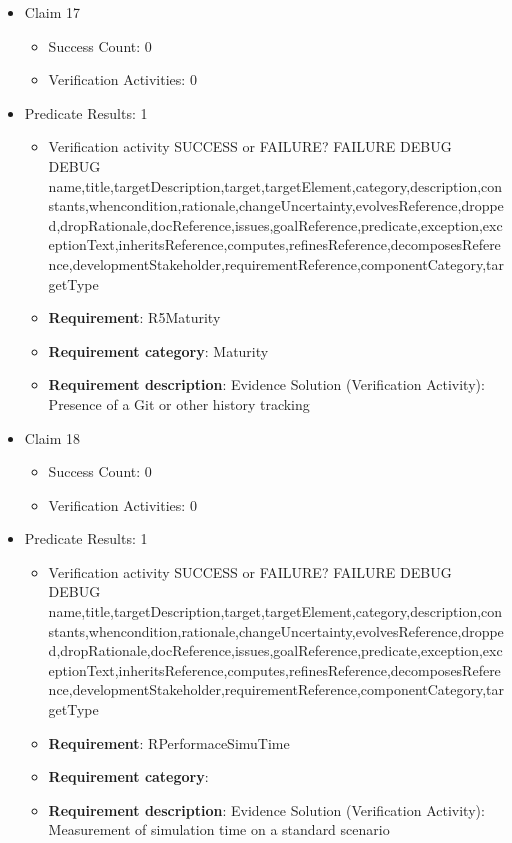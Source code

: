 \documentclass{article}
\begin{document}
\begin{itemize}
  				  \item Claim 17
				\begin{itemize}
			    	\item Success Count: 0 
			    	\item Verification Activities: 0
				\end{itemize}
				
									    
				\item Predicate Results: 1
					\begin{itemize}				
					\item Verification activity SUCCESS or FAILURE? FAILURE
					DEBUG DEBUG name,title,targetDescription,target,targetElement,category,description,constants,whencondition,rationale,changeUncertainty,evolvesReference,dropped,dropRationale,docReference,issues,goalReference,predicate,exception,exceptionText,inheritsReference,computes,refinesReference,decomposesReference,developmentStakeholder,requirementReference,componentCategory,targetType
					\item \textbf{Requirement}: R5Maturity 
					\item \textbf{Requirement category}: Maturity
					\item \textbf{Requirement description}: Evidence Solution (Verification Activity): Presence of a Git or other history tracking
					\end{itemize}

  				  \item Claim 18
				\begin{itemize}
			    	\item Success Count: 0 
			    	\item Verification Activities: 0
				\end{itemize}
				
									    
				\item Predicate Results: 1
					\begin{itemize}				
					\item Verification activity SUCCESS or FAILURE? FAILURE
					DEBUG DEBUG name,title,targetDescription,target,targetElement,category,description,constants,whencondition,rationale,changeUncertainty,evolvesReference,dropped,dropRationale,docReference,issues,goalReference,predicate,exception,exceptionText,inheritsReference,computes,refinesReference,decomposesReference,developmentStakeholder,requirementReference,componentCategory,targetType
					\item \textbf{Requirement}: RPerformaceSimuTime 
					\item \textbf{Requirement category}: 
					\item \textbf{Requirement description}: Evidence Solution (Verification Activity): Measurement of simulation time on a standard scenario
					\end{itemize}


\end{itemize}
\end{document}
